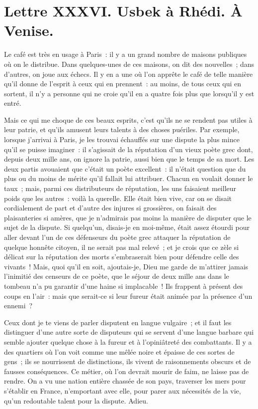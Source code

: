 \documentclass[french,twoside]{book} %
\newcommand{\dateline}[1]{\medskip{\RaggedLeft{#1}\par}\bigskip}
\begin{document}
\dateline{À Paris, le 20 de la lune de Zilhagé, 1713.}
\section[{Lettre XXXVI. Usbek à Rhédi. À Venise.}]{Lettre XXXVI. Usbek à Rhédi. À Venise.}\renewcommand{\leftmark}{Lettre XXXVI. Usbek à Rhédi. À Venise.}

\noindent Le café est très en usage à Paris : il y a un grand nombre de maisons publiques où on le distribue. Dans quelques-unes de ces maisons, on dit des nouvelles ; dans d’autres, on joue aux échecs. Il y en a une où l’on apprête le café de telle manière qu’il donne de l’esprit à ceux qui en prennent : au moins, de tous ceux qui en sortent, il n’y a personne qui ne croie qu’il en a quatre fois plus que lorsqu’il y est entré.\par
Mais ce qui me choque de ces beaux esprits, c’est qu’ils ne se rendent pas utiles à leur patrie, et qu’ils amusent leurs talents à des choses puériles. Par exemple, lorsque j’arrivai à Paris, je les trouvai échauffés sur une dispute la plus mince qu’il se puisse imaginer : il s’agissait de la réputation d’un vieux poète grec dont, depuis deux mille ans, on ignore la patrie, aussi bien que le temps de sa mort. Les deux partis avouaient que c’était un poète excellent : il n’était question que du plus ou du moins de mérite qu’il fallait lui attribuer. Chacun en voulait donner le taux ; mais, parmi ces distributeurs de réputation, les uns faisaient meilleur poids que les autres : voilà la querelle. Elle était bien vive, car on se disait cordialement de part et d’autre des injures si grossières, on faisait des plaisanteries si amères, que je n’admirais pas moins la manière de disputer que le sujet de la dispute. Si quelqu’un, disais-je en moi-même, était assez étourdi pour aller devant l’un de ces défenseurs du poète grec attaquer la réputation de quelque honnête citoyen, il ne serait pas mal relevé ; et je crois que ce zèle si délicat sur la réputation des morts s’embraserait bien pour défendre celle des vivants ! Mais, quoi qu’il en soit, ajoutais-je, Dieu me garde de m’attirer jamais l’inimitié des censeurs de ce poète, que le séjour de deux mille ans dans le tombeau n’a pu garantir d’une haine si implacable ! Ils frappent à présent des coups en l’air : mais que serait-ce si leur fureur était animée par la présence d’un ennemi ?\par
Ceux dont je te viens de parler disputent en langue vulgaire ; et il faut les distinguer d’une autre sorte de disputeurs qui se servent d’une langue barbare qui semble ajouter quelque chose à la fureur et à l’opiniâtreté des combattants. Il y a des quartiers où l’on voit comme une mêlée noire et épaisse de ces sortes de gens ; ils se nourrissent de distinctions, ils vivent de raisonnements obscurs et de fausses conséquences. Ce métier, où l’on devrait mourir de faim, ne laisse pas de rendre. On a vu une nation entière chassée de son pays, traverser les mers pour s’établir en France, n’emportant avec elle, pour parer aux nécessités de la vie, qu’un redoutable talent pour la dispute. Adieu.\par
\end{document}
